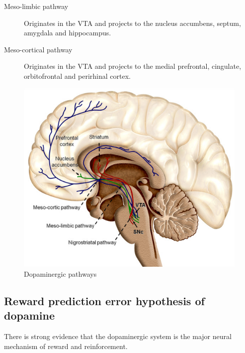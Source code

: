 \begin{description}
\begin{description}
            \item[Meso-limbic pathway] 
                Originates in the VTA and projects to the nucleus accumbens, septum, amygdala and hippocampus.

            \item[Meso-cortical pathway] 
                Originates in the VTA and projects to the medial prefrontal, cingulate, orbitofrontal and perirhinal cortex.
        \end{description}

        \begin{figure}[H]
            \centering
            \includegraphics[width=0.3\linewidth]{./img/dopaminergic_pathways.png}
            \caption{Dopaminergic pathways}
        \end{figure}
\end{description}


\subsection{Reward prediction error hypothesis of dopamine}

There is strong evidence that the dopaminergic system is the major neural mechanism of reward and reinforcement.

